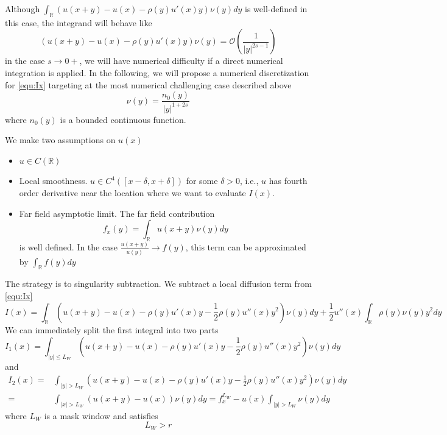\documentclass[10pt,a4paper]{article}
\newcommand{\RR}[0]{\mathbb{R}}
\theoremstyle{definition}
\begin{document}
Although $\int_{\RR}(u(x+y)-u(x)-\rho(y)u'(x)y)\nu(y)dy$ is well-defined in this case, the integrand will behave like 
\begin{equation}
	(u(x+y)-u(x)-\rho(y)u'(x)y)\nu(y) = \mathcal{O}\left(\frac{1}{|y|^{2s-1}}\right)
\end{equation}
in the case $s\rightarrow 0+$, we will have numerical difficulty if a direct numerical integration is applied. In the following, we will propose a numerical discretization for \cref{equ:Ix} targeting at the most numerical challenging case described above 
\begin{equation}\label{equ:ny2}
	\nu(y) = \frac{n_0(y)}{|y|^{1+2s}}
\end{equation} 
where $n_0(y)$ is a bounded continuous function. 

We make two assumptions on $u(x)$
\begin{itemize}
	\item $u\in C(\RR)$ 
	\item Local smoothness. $u\in C^4([x-\delta, x+\delta])$ for some $\delta>0$, i.e., $u$ has fourth order derivative near the location where we want to evaluate $I(x)$.
	\item Far field asymptotic limit. The far field contribution
	\begin{equation}\label{equ:fxy}
		f_x(y) = \int_{\RR}u(x+y)\nu(y)dy
	\end{equation}
	is well defined. In the case $\frac{u(x+y)}{u(y)}\rightarrow f(y)$, this term can be approximated by $\int_\RR f(y)dy$
\end{itemize}

The strategy is to singularity subtraction. We subtract a local diffusion term from \cref{equ:Ix}
\begin{equation}\label{equ:evalIx1d}
	I(x) = \int_{\RR}(u(x+y)-u(x)-\rho(y)u'(x)y- \frac{1}{2}\rho(y)u''(x)y^2 )\nu(y)dy + \frac{1}{2}u''(x)\int_\RR \rho(y)\nu(y)y^2 dy
\end{equation}
We can immediately split the first integral into two parts
\begin{equation}
	I_1(x) = \int_{|y|\leq L_W}(u(x+y)-u(x)-\rho(y)u'(x)y- \frac{1}{2}\rho(y)u''(x)y^2 )\nu(y)dy
\end{equation}
and
\begin{align}
	I_2(x) =& \int_{|y|> L_W}(u(x+y)-u(x)-\rho(y)u'(x)y- \frac{1}{2}\rho(y)u''(x)y^2 )\nu(y)dy\\
	 = &\int_{|x|> L_W}(u(x+y)-u(x) )\nu(y)dy = f_x^{L_W} - u(x)\int_{|y|> L_W}\nu(y)dy
\end{align}
where $L_W$ is a mask window and satisfies
\begin{equation}
	L_W > r
\end{equation}
\end{document}
